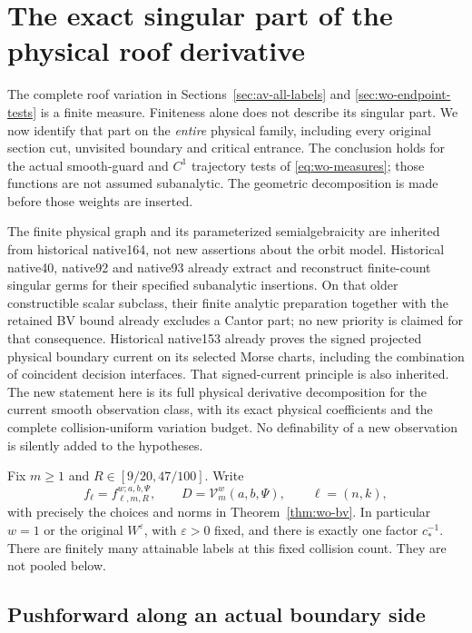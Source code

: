 \section{The exact singular part of the physical roof derivative}
\label{sec:sbv-roof}

The complete roof variation in Sections~\ref{sec:av-all-labels} and
\ref{sec:wo-endpoint-tests} is a finite measure.  Finiteness alone does
not describe its singular part.  We now identify that part on the
\emph{entire} physical family, including every original section cut,
unvisited boundary and critical entrance.  The conclusion holds for
the actual smooth-guard and $C^1$ trajectory tests of
\eqref{eq:wo-measures}; those functions are not assumed subanalytic.
The geometric decomposition is made before those weights are inserted.

The finite physical graph and its parameterized semialgebraicity are
inherited from historical native164, not new assertions about the
orbit model.  Historical native40, native92 and native93 already extract and
reconstruct finite-count singular germs for their specified subanalytic
insertions.  On that older constructible scalar subclass, their
finite analytic preparation together with the retained BV bound
already excludes a Cantor part; no new priority is claimed for that
consequence.  Historical native153 already proves the signed
projected physical boundary current on its selected Morse charts,
including the combination of coincident decision interfaces.  That
signed-current principle is also inherited.  The new statement here
is its full physical derivative decomposition for the current
smooth observation class, with its exact physical coefficients
and the complete collision-uniform variation budget.  No definability
of a new observation is silently added to the hypotheses.

Fix $m\ge1$ and $R\in[9/20,47/100]$.  Write
\[
 f_{\ell}=f^{w;a,b,\Psi}_{\ell,m,R},\qquad
 D=\mathcal V_m^w(a,b,\Psi),\qquad \ell=(n,k),
\]
with precisely the choices and norms in
Theorem~\ref{thm:wo-bv}.  In particular $w=1$ or the original
$W^\varepsilon$, with $\varepsilon>0$ fixed, and there is exactly
one factor $c_*^{-1}$.  There are finitely many attainable labels at
this fixed collision count.  They are not pooled below.

\subsection{Pushforward along an actual boundary side}

